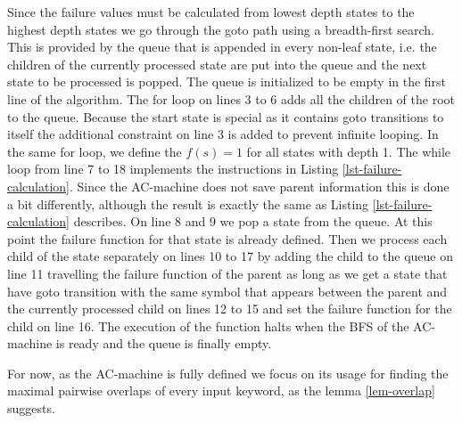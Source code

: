 \documentclass[english,twoside,censored,csm,algorithms-track-2020]{HYthesisML}
\newcommand*\circled[1]{\tikz[baseline=(char.base)]{
    \node[shape=circle,draw,inner sep=2pt] (char) {#1};}}
\theoremstyle{plain}
\theoremstyle{definition}
\begin{document}
  Since the failure values must be calculated from lowest depth states to the highest depth states
  we go through the goto path using a breadth-first search. This is provided by the queue that is
  appended in every non-leaf state, i.e. the children of the currently processed state are put into the
  queue and the next state to be processed is popped. The queue is initialized to be empty in the first
  line of the algorithm. The for loop on lines 3 to 6 adds all the children of the root to the queue.
  Because the start state is special as it contains goto transitions to itself the additional constraint
  on line 3 is added to prevent infinite looping. In the same for loop, we define the
  $f(s)=1$ for all states with depth 1. The while loop from line 7 to 18 implements the instructions
  in Listing \ref{lst-failure-calculation}. Since the AC-machine does not save parent information
  this is done a bit differently, although the result is exactly the same as Listing
  \ref{lst-failure-calculation} describes. On line 8 and 9 we pop a
  state from the queue. At this point the failure function for that state is already defined. Then we
  process each child of the state separately on lines 10 to 17 by \circled{1} adding the child to the
  queue  on line 11  \circled{2} travelling the failure function of the parent as long as we get a state
  that have goto   transition with the same symbol that appears between the parent and the currently
  processed child on lines 12 to 15 and  \circled{3} set the failure function for the child on line 16.
  The execution of the function halts when the BFS of the  AC-machine is ready and the queue is
  finally empty.

  For now, as the AC-machine is fully defined we focus on its usage for finding the maximal pairwise
  overlaps of every input keyword, as the lemma \ref{lem-overlap} suggests.
\end{document}
